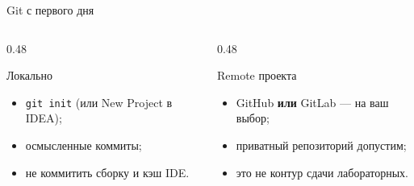 \begin{frame}{Git с первого дня}

  \medskip
  \begin{columns}[T]
    \begin{column}{0.48\textwidth}
      \begin{block}{Локально}
        \begin{itemize}
          \item \texttt{git init} (или New Project в IDEA);
          \item осмысленные коммиты;
          \item не коммитить сборку и кэш IDE.
        \end{itemize}
      \end{block}
    \end{column}
    \begin{column}{0.48\textwidth}
      \begin{block}{Remote проекта}
        \begin{itemize}
          \item GitHub \textbf{или} GitLab --- на ваш выбор;
          \item приватный репозиторий допустим;
          \item это не контур сдачи лабораторных.
        \end{itemize}
      \end{block}
    \end{column}
  \end{columns}
\end{frame}
